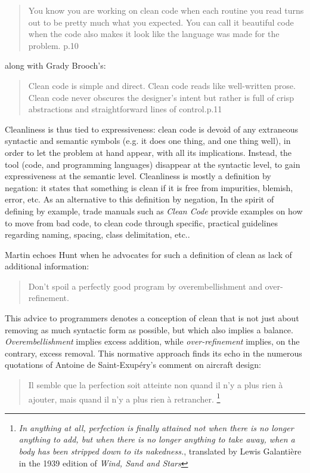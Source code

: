 \begin{quote}
  You know you are working on clean code when each routine you read turns out to be pretty much what you expected. You can call it beautiful code when the code also makes it look like the language was made for the problem.\cite{martin_clean_2008} p.10
\end{quote}

along with Grady Brooch's:

\begin{quote}
  Clean code is simple and direct. Clean code reads like well-written prose. Clean code never obscures the designer’s intent but rather is full of crisp abstractions and straightforward lines of control.\cite{martin_clean_2008}p.11
\end{quote}

Cleanliness is thus tied to expressiveness: clean code is devoid of any extraneous syntactic and semantic symbols (e.g. it does one thing, and one thing well), in order to let the problem at hand appear, with all its implications. Instead, the tool (code, and programming languages) disappear at the syntactic level, to gain expressiveness at the semantic level. Cleanliness is mostly a definition by negation: it states that something is clean if it is free from impurities, blemish, error, etc. As an alternative to this definition by negation, In the spirit of defining by example, trade manuals such as \emph{Clean Code} provide examples on how to move from bad code, to clean code through specific, practical guidelines regarding naming, spacing, class delimitation, etc..

Martin echoes Hunt when he advocates for such a definition of clean as lack of additional information:

\begin{quote}
  Don't spoil a perfectly good program by overembellishment and over-refinement.\cite{hunt_pragmatic_1999}
\end{quote}

This advice to programmers denotes a conception of clean that is not just about removing as much syntactic form as possible, but which also implies a balance. \emph{Overembellishment} implies excess addition, while \emph{over-refinement} implies, on the contrary, excess removal. This normative approach finds its echo in the numerous quotations of Antoine de Saint-Exupéry's comment on aircraft design:

\begin{quote}
  Il semble que la perfection soit atteinte non quand il n'y a plus rien à ajouter, mais quand il n'y a plus rien à retrancher. \cite{desaint-exupery_terre_1972}\footnote{\emph{ In anything at all, perfection is finally attained not when there is no longer anything to add, but when there is no longer anything to take away, when a body has been stripped down to its nakedness.}, translated by Lewis Galantière in the 1939 edition of \emph{Wind, Sand and Stars}}
\end{quote}

